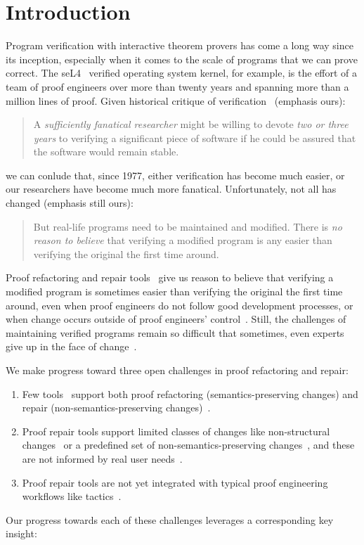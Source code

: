 \section{Introduction}

Program verification with interactive theorem provers has come a long way since its inception,
especially when it comes to the scale of programs that we can prove correct.
The seL4~\cite{Klein2009} verified operating system kernel, for example,
is the effort of a team of proof engineers over more than twenty years and spanning more than
a million lines of proof.
Given historical critique of verification~\cite{DeMillo1977} (emphasis ours):

\begin{quote}
A \textit{sufficiently fanatical researcher}
might be willing to devote \textit{two or 
three years} to verifying a significant 
piece of software if he could be 
assured that the software would remain stable.
\end{quote}
we can conlude that, since 1977, either verification has become much easier,
or our researchers have become much more fanatical. Unfortunately, not all has changed (emphasis still ours):

\begin{quote}
But real-life programs need to 
be maintained and modified. 
There is \textit{no reason to believe} that verifying a modified program is any 
easier than verifying the original the 
first time around.
\end{quote}
Proof refactoring and repair tools~\cite{wibergh2019, WhitesidePhD, Dietrich2013,
adams2015, Bourke12, Roe2016, robert2018, pumpkinpatch} give us reason to believe
that verifying a modified program is sometimes easier than verifying the original the first time
around, even when proof engineers do not follow good development processes,
or when change occurs outside of proof engineers' control~\cite{PGL-045}.
Still, the challenges of maintaining verified programs remain so difficult that
sometimes, even experts give up in the face of change~\cite{replica}.

We make progress toward three open challenges in proof refactoring and repair:

\begin{enumerate}
\item Few tools~\cite{robert2018, wibergh2019} support both proof refactoring (semantics-preserving changes) and repair (non-semantics-preserving changes)~\cite{PGL-045}.
\item Proof repair tools support limited classes of changes like non-structural changes~\cite{pumpkinpatch} or a predefined set
of non-semantics-preserving changes~\cite{robert2018, wibergh2019}, and these are not informed by real user needs~\cite{replica}.
\item Proof repair tools are not yet integrated with typical proof engineering workflows like tactics~\cite{PGL-045, pumpkinpatch, robert2018}.
\end{enumerate}
Our progress towards each of these challenges leverages a corresponding key insight: %

